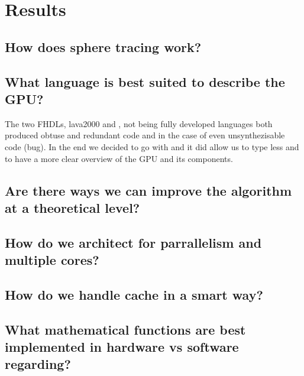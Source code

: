\chapter{Results}

	\section{How does sphere tracing work?}

	\section{What language is best suited to describe the GPU?}
	
	The two FHDLs, lava2000 and \clash, not being fully developed languages both produced obtuse and redundant code and in the case of \clash even unsynthezisable code (bug). In the end we decided to go with \clash and it did allow us to type less and to have a more clear overview of the GPU and its components.

	\section{Are there ways we can improve the algorithm at a theoretical level?}



	\section{How do we architect for parrallelism and multiple cores?}

	\section{How do we handle cache in a smart way?}

	\section{What mathematical functions are best implemented in hardware vs software regarding?}
